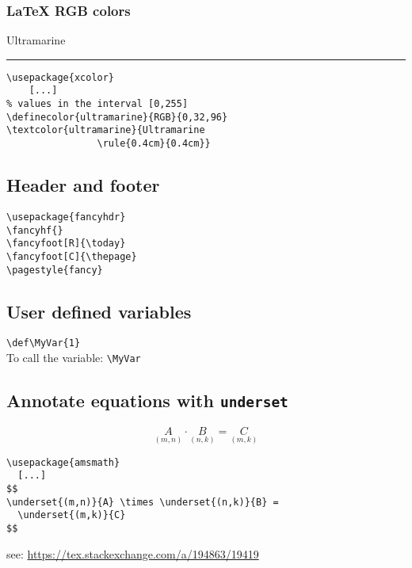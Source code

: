 \subsubsection{LaTeX RGB colors}
\textcolor{ultramarine}{Ultramarine \rule{0.4cm}{0.4cm}}
\begin{minipage}[c]{3cm}
  \begin{verbatim}
\usepackage{xcolor}
    [...]
% values in the interval [0,255]
\definecolor{ultramarine}{RGB}{0,32,96}
\textcolor{ultramarine}{Ultramarine
                \rule{0.4cm}{0.4cm}}
  \end{verbatim}
\end{minipage}

\subsection{Header and footer}
\begin{verbatim}
\usepackage{fancyhdr}
\fancyhf{}
\fancyfoot[R]{\today}
\fancyfoot[C]{\thepage}
\pagestyle{fancy}
\end{verbatim}

\subsection{User defined variables}
\verb|\def\MyVar{1}|\\
To call the variable: \verb|\MyVar|

\subsection{Annotate equations with \texttt{underset}}
$$
\underset{(m,n)}{A} \cdot \underset{(n,k)}{B} =
  \underset{(m,k)}{C}
$$
\begin{verbatim}
\usepackage{amsmath}
  [...]
$$
\underset{(m,n)}{A} \times \underset{(n,k)}{B} =
  \underset{(m,k)}{C}
$$
\end{verbatim}
see: \url{https://tex.stackexchange.com/a/194863/19419}
